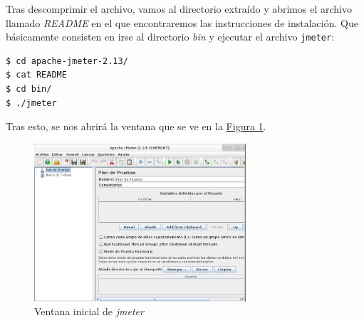 \documentclass[10pt,a4paper,spanish]{article}
\numberwithin{equation}{section} %
\numberwithin{figure}{section} %
\numberwithin{table}{section} %
\begin{document}
Tras descomprimir el archivo, vamos al directorio extraído y abrimos el archivo llamado \textit{README} en el que encontraremos las instrucciones de instalación. Que básicamente consisten en irse al directorio \textit{bin} y ejecutar el archivo \texttt{jmeter}:

\begin{verbatim}
$ cd apache-jmeter-2.13/
$ cat README
$ cd bin/
$ ./jmeter
\end{verbatim}

Tras esto, se nos abrirá la ventana que se ve en la \hyperref[jmeter]{Figura \ref*{jmeter}}.

\begin{figure}[!h]
    \centering
    \includegraphics[width=0.7\textwidth]{9}
    \caption{Ventana inicial de \textit{jmeter}}
    \label{jmeter}
\end{figure}
\end{document}
